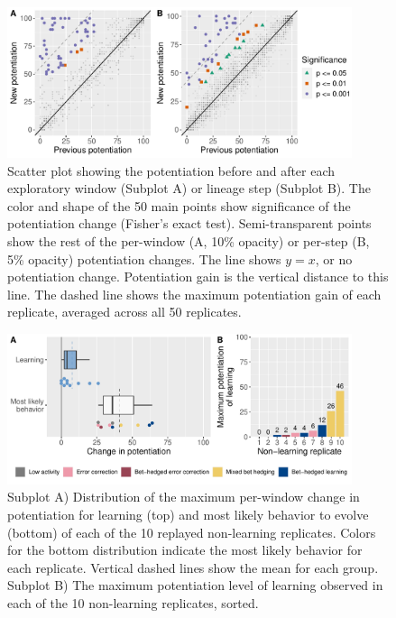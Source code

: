 \begin{figure}[h!]
\begin{center}
\includegraphics[width=0.9\textwidth]{04_learning_extension/media/replays_stats_legend_on_right.pdf}
\end{center}
\caption{ 
Scatter plot showing the potentiation before and after each exploratory window (Subplot A) or lineage step (Subplot B). 
The color and shape of the 50 main points show significance of the potentiation change (Fisher's exact test).
Semi-transparent points show the rest of the per-window (A, 10\% opacity) or per-step (B, 5\% opacity) potentiation changes. 
The line shows $y=x$, or no potentiation change. 
Potentiation gain is the vertical distance to this line. 
The dashed line shows the maximum potentiation gain of each replicate, averaged across all 50 replicates. 
}\label{fig:replay_stats}
\end{figure}

\begin{figure}[h!]
\begin{center}
\includegraphics[width=0.9\textwidth]{04_learning_extension/media/non_learning_with_max.pdf}
\end{center}
\caption{ 
Subplot A) Distribution of the maximum per-window change in potentiation for learning (top) and most likely behavior to evolve (bottom) of each of the 10 replayed non-learning replicates.
Colors for the bottom distribution indicate the most likely behavior for each replicate.
Vertical dashed lines show the mean for each group.
Subplot B) The maximum potentiation level of learning observed in each of the 10 non-learning replicates, sorted. 
}\label{fig:non_learning}
\end{figure}

